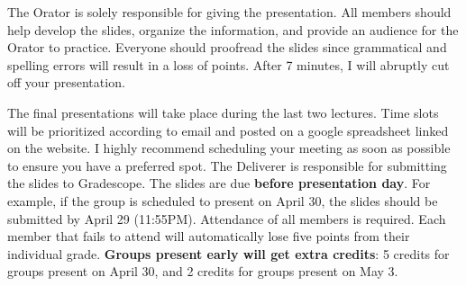 \documentclass[
]{article}
\begin{document}
The Orator is solely responsible for giving the presentation. All
members should help develop the slides, organize the information, and
provide an audience for the Orator to practice. Everyone should
proofread the slides since grammatical and spelling errors will result
in a loss of points. After 7 minutes, I will abruptly cut off your
presentation.

The final presentations will take place during the last two lectures.
Time slots will be prioritized according to email and posted on a google
spreadsheet linked on the website. I highly recommend scheduling your
meeting as soon as possible to ensure you have a preferred spot. The
Deliverer is responsible for submitting the slides to Gradescope. The
slides are due \textbf{before presentation day}. For example, if the
group is scheduled to present on April 30, the slides should be
submitted by April 29 (11:55PM). Attendance of all members is required.
Each member that fails to attend will automatically lose five points
from their individual grade. \textbf{Groups present early will get extra
credits}: 5 credits for groups present on April 30, and 2 credits for
groups present on May 3.
\end{document}
